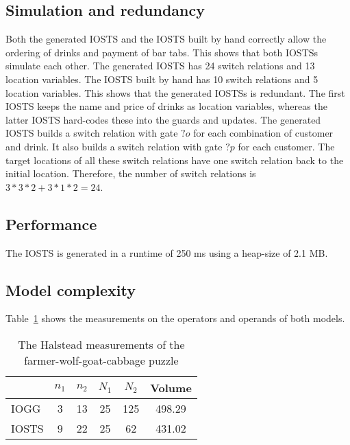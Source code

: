 \subsection{Simulation and redundancy}
Both the generated IOSTS and the IOSTS built by hand correctly allow the ordering of drinks and payment of bar tabs. This shows that both IOSTSs simulate each other. The generated IOSTS has 24 switch relations and 13 location variables. The IOSTS built by hand has 10 switch relations and 5 location variables. This shows that the generated IOSTSs is redundant. The first IOSTS keeps the name and price of drinks as location variables, whereas the latter IOSTS hard-codes these into the guards and updates. The generated IOSTS builds a switch relation with gate $?o$ for each combination of customer and drink. It also builds a switch relation with gate $?p$ for each customer. The target locations of all these switch relations have one switch relation back to the initial location. Therefore, the number of switch relations is $3*3*2+3*1*2 = 24$.

\subsection{Performance}
The IOSTS is generated in a runtime of 250 ms using a heap-size of 2.1 MB.

\subsection{Model complexity}
\begin{comment}
start: 1 - 25. 13 - 46
?o: 1 - 2. 1 - 14
!po: 2 - 3. 4 - 24
?p: 0 - 0. 3 - 18
!pp: 3 - 
\end{comment}

Table~\ref{tab:halstead-bartab} shows the measurements on the operators and operands of both models.

\begin{table}[ht]
\begin{center}
\begin{tabular}{| l | c | c | c | c | c |}
  \hline
  & $n_1$ & $n_2$ & $N_1$ & $N_2$ & Volume \\ \hline
  IOGG & 3 & 13 & 25 & 125 & 498.29 \\ \hline
  IOSTS & 9 & 22 & 25 & 62 & 431.02 \\
  \hline
\end{tabular}
\end{center}
\caption{The Halstead measurements of the farmer-wolf-goat-cabbage puzzle}
\label{tab:halstead-bartab}
\end{table}


